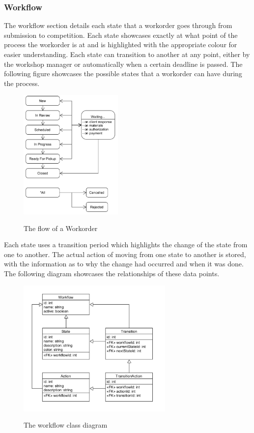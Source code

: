 {{{{{{{{\subsubsection{Workflow}
The workflow section details each state that a workorder goes through from submission to competition. Each state showcases exactly at what point of the process the workorder is at and is highlighted with the appropriate colour for easier understanding. Each state can transition to another at any point, either by the workshop manager or automatically when a certain deadline is passed. The following figure showcases the possible states that a workorder can have during the process. 
\begin{figure}[H]
	\centering
	\includegraphics[width=2in]{workflow-diagram.png}\\
	\caption{The flow of a Workorder}
	\label{fig:tobias}
\end{figure}
\newpage
Each state uses a transition period which highlights the change of the state from one to another. The actual action of moving from one state to another is stored, with the information as to why the change had occurred and when it was done. The following diagram showcases the relationships of these data points. 
\begin{figure}[H]
	\centering
	\includegraphics[width=3in]{workflow-class.png}\\
	\caption{The workflow class diagram}
	\label{fig:tobias}
\end{figure}
\newpage
}}}}}}}}
